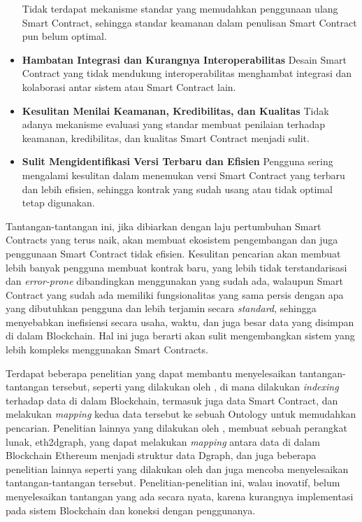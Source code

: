 \begin{itemize}
    Tidak terdapat mekanisme standar yang memudahkan penggunaan ulang Smart Contract, sehingga standar keamanan dalam penulisan Smart Contract pun belum optimal.  
    \item \textbf{Hambatan Integrasi dan Kurangnya Interoperabilitas} \newline
    Desain Smart Contract yang tidak mendukung interoperabilitas menghambat integrasi dan kolaborasi antar sistem atau Smart Contract lain.
    \item \textbf{Kesulitan Menilai Keamanan, Kredibilitas, dan Kualitas} \newline
    Tidak adanya mekanisme evaluasi yang standar membuat penilaian terhadap keamanan, kredibilitas, dan kualitas Smart Contract menjadi sulit.
    \item \textbf{Sulit Mengidentifikasi Versi Terbaru dan Efisien} \newline
    Pengguna sering mengalami kesulitan dalam menemukan versi Smart Contract yang terbaru dan lebih efisien, sehingga kontrak yang sudah usang atau tidak optimal tetap digunakan.
\end{itemize}

Tantangan-tantangan ini, jika dibiarkan dengan laju pertumbuhan Smart Contracts yang terus naik, akan membuat ekosistem pengembangan dan juga penggunaan Smart Contract tidak efisien. Kesulitan pencarian akan membuat lebih banyak pengguna membuat kontrak baru, yang lebih tidak terstandarisasi dan \textit{error-prone} dibandingkan menggunakan yang sudah ada, walaupun Smart Contract yang sudah ada memiliki fungsionalitas yang sama persis dengan apa yang dibutuhkan pengguna dan lebih terjamin secara \textit{standard}, sehingga menyebabkan inefisiensi secara usaha, waktu, dan juga besar data yang disimpan di dalam Blockchain. Hal ini juga berarti akan sulit mengembangkan sistem yang lebih kompleks menggunakan Smart Contracts.

Terdapat beberapa penelitian yang dapat membantu menyelesaikan tantangan-tantangan tersebut, seperti yang dilakukan oleh \cite{third2017linked}, di mana dilakukan \textit{indexing} terhadap data di dalam Blockchain, termasuk juga data Smart Contract, dan melakukan \textit{mapping} kedua data tersebut ke sebuah Ontology untuk memudahkan pencarian. Penelitian lainnya yang dilakukan oleh \cite{aimar2023extraction}, membuat sebuah perangkat lunak, eth2dgraph, yang dapat melakukan \textit{mapping} antara data di dalam Blockchain Ethereum menjadi struktur data Dgraph, dan juga beberapa penelitian lainnya seperti yang dilakukan oleh \cite{baqa2019semantic} dan \cite{cano2021toward} juga mencoba menyelesaikan tantangan-tantangan tersebut. Penelitian-penelitian ini, walau inovatif, belum menyelesaikan tantangan yang ada secara nyata, karena kurangnya implementasi pada sistem Blockchain dan koneksi dengan penggunanya. 

